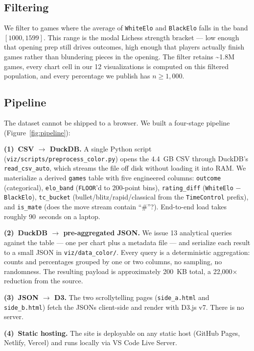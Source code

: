 \documentclass[sigconf,nonacm,natbib=false]{acmart}
\begin{document}
\subsection{Filtering}
We filter to games where the average of \texttt{WhiteElo} and
\texttt{BlackElo} falls in the band $[1000, 1599]$. This range is
the modal Lichess strength bracket --- low enough that opening prep
still drives outcomes, high enough that players actually finish
games rather than blundering pieces in the opening. The filter
retains \textasciitilde 1.8M games, every chart cell in our 12
visualizations is computed on this filtered population, and every
percentage we publish has $n \geq 1{,}000$.

\subsection{Pipeline}
The dataset cannot be shipped to a browser. We built a four-stage
pipeline (Figure~\ref{fig:pipeline}):

\textbf{(1)~CSV $\rightarrow$ DuckDB.} A single Python script
(\texttt{viz/scripts/preprocess\_color.py}) opens the 4.4~GB CSV
through DuckDB's \texttt{read\_csv\_auto}, which streams the file
off disk without loading it into RAM. We materialize a derived
\texttt{games} table with five engineered columns:
\texttt{outcome} (categorical), \texttt{elo\_band}
(\texttt{FLOOR}'d to 200-point bins), \texttt{rating\_diff}
(\texttt{WhiteElo} $-$ \texttt{BlackElo}), \texttt{tc\_bucket}
(bullet/blitz/rapid/classical from the \texttt{TimeControl}
prefix), and \texttt{is\_mate} (does the move stream contain
``\#''?). End-to-end load takes roughly 90~seconds on a laptop.

\textbf{(2)~DuckDB $\rightarrow$ pre-aggregated JSON.} We issue 13
analytical queries against the table --- one per chart plus a
metadata file --- and serialize each result to a small JSON in
\texttt{viz/data\_color/}. Every query is a deterministic
aggregation: counts and percentages grouped by one or two columns,
no sampling, no randomness. The resulting payload is approximately
200~KB total, a 22{,}000$\times$ reduction from the source.

\textbf{(3)~JSON $\rightarrow$ D3.} The two scrollytelling pages
(\texttt{side\_a.html} and \texttt{side\_b.html}) fetch the JSONs
client-side and render with D3.js v7. There is no server.

\textbf{(4)~Static hosting.} The site is deployable on any static
host (GitHub Pages, Netlify, Vercel) and runs locally via VS Code
Live Server.
\end{document}
